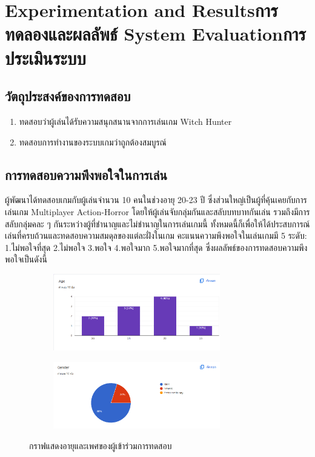 \chapter{\ifproject%
\ifenglish Experimentation and Results\else การทดลองและผลลัพธ์\fi
\else%
\ifenglish System Evaluation\else การประเมินระบบ\fi
\fi}
\section{วัตถุประสงค์ของการทดสอบ}
\begin{enumerate}
    \item ทดสอบว่าผู้เล่นได้รับความสนุกสนานจากการเล่นเกม Witch Hunter
    \item ทดสอบการทำงานของระบบเกมว่าถูกต้องสมบูรณ์
\end{enumerate}
\section{การทดสอบความพึงพอใจในการเล่น}

ผู้พัฒนาได้ทดสอบเกมกับผู้เล่นจำนวน 10 คนในช่วงอายุ 20-23 ปี ซึ่งส่วนใหญ่เป็นผู้ที่คุ้นเคยกับการเล่นเกม Multiplayer Action-Horror
โดยให้ผู้เล่นจับกลุ่มกันและสลับบทบาทกันเล่น รวมถึงมีการสลับกลุ่มคละ ๆ กันระหว่างผู้ที่ชำนาญและไม่ชำนาญในการเล่นเกมนี้
ทั้งหมดนี้ก็เพื่อให้ได้ประสบการณ์เล่นที่ครบถ้วนและทดสอบความสมดุลของแต่ละฝั่งในเกม คะแนนความพึงพอใจในเล่นเกมมี 5 ระดับ:
1.ไม่พอใจที่สุด 2.ไม่พอใจ 3.พอใจ 4.พอใจมาก 5.พอใจมากที่สุด  ซึ่งผลลัพธ์ของการทดสอบความพึงพอใจเป็นดังนี้

\begin{figure}[h]
\begin{subfigure}{\textwidth}
    \begin{center}
    \includegraphics[width=0.8\textwidth]{./img/result/1.png}
    \label{fig:age}
    \end{center}
\end{subfigure}
\begin{subfigure}{\textwidth}
    \begin{center}
    \includegraphics[width=0.8\textwidth]{./img/result/2.png}
    \label{fig:gender}
    \end{center}
\end{subfigure}
\caption{กราฟแสดงอายุและเพศของผู้เข้าร่วมการทดสอบ}
\end{figure}

